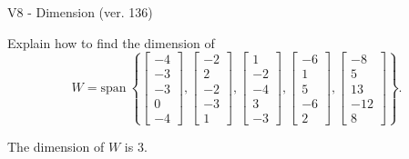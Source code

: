\begin{exercise}
  \begin{exerciseTitle}V8 - Dimension (ver. 136)\end{exerciseTitle}
  \begin{exerciseStatement}
    Explain how to find the dimension of 
\[W=\mathrm{span}\ \left\{\left[\begin{array}{r}
-4 \\
-3 \\
-3 \\
0 \\
-4
\end{array}\right] , \left[\begin{array}{r}
-2 \\
2 \\
-2 \\
-3 \\
1
\end{array}\right] , \left[\begin{array}{r}
1 \\
-2 \\
-4 \\
3 \\
-3
\end{array}\right] , \left[\begin{array}{r}
-6 \\
1 \\
5 \\
-6 \\
2
\end{array}\right] , \left[\begin{array}{r}
-8 \\
5 \\
13 \\
-12 \\
8
\end{array}\right]\right\}.\]



  \end{exerciseStatement}
  \begin{exerciseAnswer}
   The dimension of \(W\) is  \(3\).
  


  \end{exerciseAnswer}
\end{exercise}